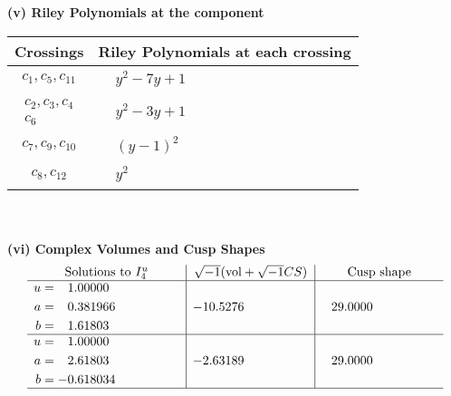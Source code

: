 \documentclass[1p]{elsarticle_modified}
\theoremstyle{definition}
\newcommand{\I}{\sqrt{-1}}
\begin{document}
\newpage\renewcommand{\arraystretch}{1}
\flushleft \textbf{(v) Riley Polynomials at the component}\newline \\
\begin{tabular}{m{50pt}|m{274pt}}
Crossings & \hspace{64pt}Riley Polynomials at each crossing \\
\hline $$\begin{aligned}c_{1},c_{5},c_{11}\end{aligned}$$&$\begin{aligned}
&y^2-7 y+1
\end{aligned}$\\
\hline $$\begin{aligned}c_{2},c_{3},c_{4}\\c_{6}\end{aligned}$$&$\begin{aligned}
&y^2-3 y+1
\end{aligned}$\\
\hline $$\begin{aligned}c_{7},c_{9},c_{10}\end{aligned}$$&$\begin{aligned}
&(y-1)^2
\end{aligned}$\\
\hline $$\begin{aligned}c_{8},c_{12}\end{aligned}$$&$\begin{aligned}
&y^2
\end{aligned}$\\
\hline
\end{tabular}\\~\\
\newpage\flushleft \textbf{(vi) Complex Volumes and Cusp Shapes}
$$\begin{array}{c|c|c}  
\text{Solutions to }I^u_{4}& \I (\text{vol} + \sqrt{-1}CS) & \text{Cusp shape}\\
 \hline 
\begin{aligned}
u &= \phantom{-}1.00000\phantom{ +0.000000I} \\
a &= \phantom{-}0.381966\phantom{ +0.000000I} \\
b &= \phantom{-}1.61803\phantom{ +0.000000I}\end{aligned}
 & -10.5276\phantom{ +0.000000I} & \phantom{-}29.0000\phantom{ +0.000000I} \\ \hline\begin{aligned}
u &= \phantom{-}1.00000\phantom{ +0.000000I} \\
a &= \phantom{-}2.61803\phantom{ +0.000000I} \\
b &= -0.618034\phantom{ +0.000000I}\end{aligned}
 & -2.63189\phantom{ +0.000000I} & \phantom{-}29.0000\phantom{ +0.000000I}\\
 \hline 
 \end{array}$$\newpage
\end{document}
